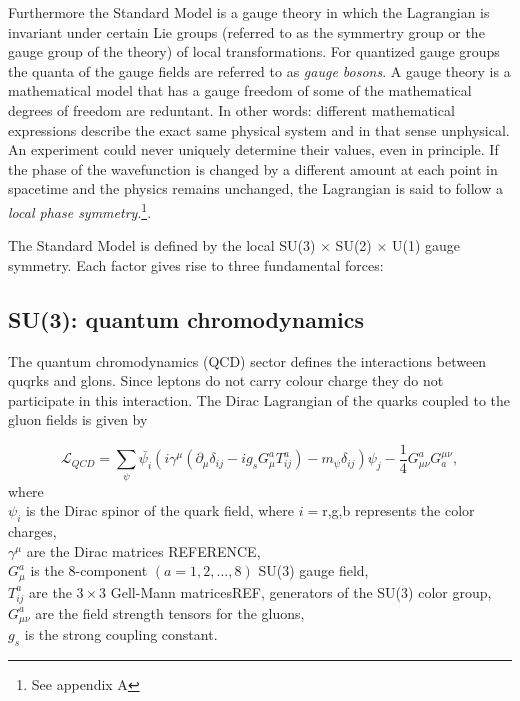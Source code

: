 Furthermore the Standard Model is a gauge theory in which the Lagrangian is invariant under certain Lie groups (referred to as the symmertry group or the gauge group of the theory) of local transformations. For quantized gauge groups the quanta of the gauge fields are referred to as \textit{gauge bosons}. A gauge theory is a mathematical model that has a gauge freedom of some of the mathematical degrees of freedom are reduntant. In other words: different mathematical expressions describe the exact same physical system and in that sense unphysical. An experiment could never uniquely determine their values, even in principle. If the phase of the wavefunction is changed by a different amount at each point in spacetime and the physics remains unchanged, the Lagrangian is said to follow a \textit{local phase symmetry}.\footnote{See appendix A}.

The Standard Model is defined by the local SU(3) $\times$ SU(2) $\times$ U(1) gauge symmetry. Each factor gives rise to three fundamental forces:
\subsection{SU(3): quantum chromodynamics}
\label{subsec:QCD}
The quantum chromodynamics (QCD) sector defines the interactions between quqrks and glons. Since leptons do not carry colour charge they do not participate in this interaction. The Dirac Lagrangian of the quarks coupled to the gluon fields is given by

\begin{equation}
\mathcal{L}_{QCD} = \sum_{\psi} \bar{\psi_i} \left(i \gamma^\mu \left(\partial_\mu  \delta_{ij} - i g_s G^a_{\mu} T^a_{ij}\right) - m_\psi \delta_{ij} \right) \psi_j - \frac{1}{4} G^a_{\mu\nu}G^{\mu\nu}_a,
\end{equation}
where\\
\indent $\psi_i$ is the Dirac spinor of the quark field, where $i=${r,g,b} represents the color charges,\\
\indent $\gamma^\mu$ are the Dirac matrices REFERENCE,\\
\indent $G^a_\mu$ is the 8-component $\left(a=1,2,...,8\right)$ SU(3) gauge field,\\
\indent $T^a_{ij}$ are the $3\times3$ Gell-Mann matricesREF, generators of the SU(3) color group,\\
\indent $G^a_{\mu\nu}$ are the field strength tensors for the gluons,\\
\indent $g_s$ is the strong coupling constant.

